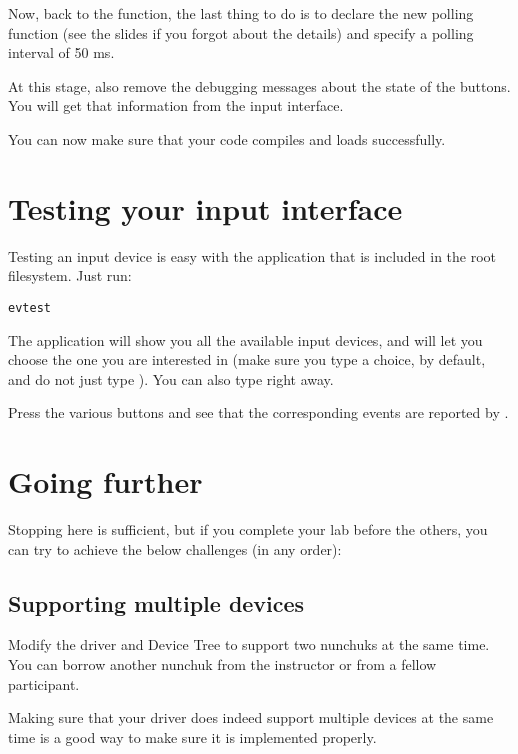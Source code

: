 
Now, back to the  function, the last thing to do
is to declare the new polling function (see the slides if you forgot
about the details) and specify a polling interval of 50 ms.

At this stage, also remove the debugging messages about the state
of the buttons. You will get that information from the input interface.

You can now make sure that your code compiles and loads successfully.

\section{Testing your input interface}

Testing an input device is easy with the  application
that is included in the root filesystem. Just run:

\begin{verbatim}
evtest
\end{verbatim}

The application will show you all the available input devices, and will let
you choose the one you are interested in (make sure you type a choice,
 by default, and do not just type \code{[Enter]}). You can also
type  right away.

Press the various buttons and see that the corresponding events are
reported by .

\section{Going further}

Stopping here is sufficient, but if you complete your lab before the
others, you can try to achieve the below challenges (in any order):

\subsection{Supporting multiple devices}

Modify the driver and Device Tree to support two nunchuks at the same
time. You can borrow another nunchuk from the instructor or from a fellow
participant.

Making sure that your driver does indeed support multiple devices at the
same time is a good way to make sure it is implemented properly.

